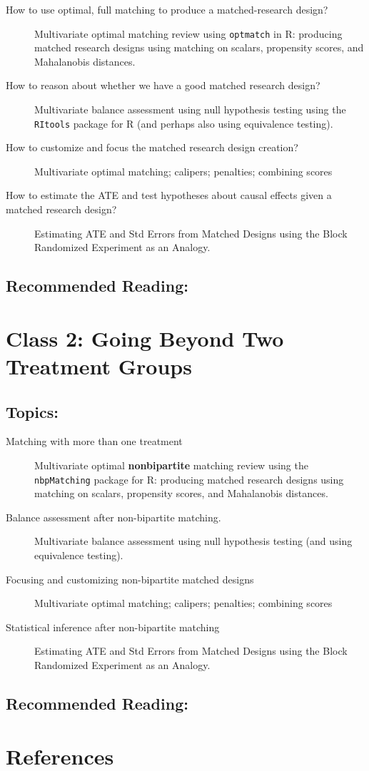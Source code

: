 \documentclass[10pt]{article}
\begin{document}
\begin{description}
	\item[How to use optimal, full matching to produce a matched-research design?] Multivariate optimal matching review using \texttt{optmatch}  in R: producing matched research designs using matching on scalars, propensity scores, and Mahalanobis distances.
	\item[How to reason about whether we have a good matched research design?] Multivariate balance assessment using null hypothesis testing using the \texttt{RItools} package for R (and perhaps also using equivalence testing).
	\item[How to customize and focus the matched research design creation?] Multivariate optimal matching; calipers; penalties; combining scores
	\item[How to estimate the ATE  and test hypotheses about causal effects given a matched research design?] Estimating ATE and Std Errors from Matched Designs using the Block Randomized Experiment as an Analogy.
\end{description}

\subsection*{Recommended Reading:}

\section*{Class 2: Going Beyond Two Treatment Groups}

\subsection*{Topics:}

\begin{description}
	\item[Matching with more than one treatment] Multivariate optimal \textbf{nonbipartite} matching review using the \texttt{nbpMatching} package for R: producing matched research designs using matching on scalars, propensity scores, and Mahalanobis distances.
	\item[Balance assessment after non-bipartite matching.] Multivariate balance assessment using null hypothesis testing (and using equivalence testing).
	\item[Focusing and customizing non-bipartite matched designs] Multivariate optimal matching; calipers; penalties; combining scores
	\item[Statistical inference after non-bipartite matching] Estimating ATE and Std Errors from Matched Designs using the Block Randomized Experiment as an Analogy.
\end{description}

\subsection*{Recommended Reading:}


\section*{References}


  
\end{document}
